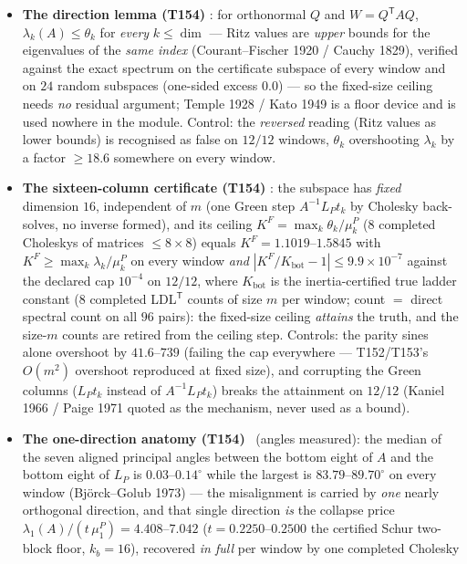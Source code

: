 \documentclass[11pt,a4paper]{article}
\begin{document}
\begin{itemize}[leftmargin=1.5em]
\item \textbf{The direction lemma (T154)} \mE: for orthonormal $Q$ and $W=Q^{\mathsf T}AQ$,
$\lambda_k(A)\le\theta_k$ for \emph{every} $k\le\dim$ --- Ritz values are \emph{upper}
bounds for the eigenvalues of the \emph{same index} (Courant--Fischer 1920 / Cauchy 1829),
verified against the exact spectrum on the certificate subspace of every window and on
$24$ random subspaces (one-sided excess $0.0$) --- so the fixed-size ceiling needs
\emph{no} residual argument; Temple 1928 / Kato 1949 is a floor device and is used nowhere
in the module. Control: the \emph{reversed} reading (Ritz values as lower bounds) is
recognised as false on $12/12$ windows, $\theta_k$ overshooting $\lambda_k$ by a factor
$\ge18.6$ somewhere on every window.
\item \textbf{The sixteen-column certificate (T154)} \mE: the subspace has \emph{fixed}
dimension $16$, independent of $m$ (one Green step $A^{-1}L_Pt_k$ by Cholesky back-solves,
no inverse formed), and its ceiling $K^F=\max_k\theta_k/\mu^P_k$ ($8$ completed Choleskys
of matrices $\le8\times8$) equals $K^F=1.1019$--$1.5845$ with $K^F\ge\max_k
\lambda_k/\mu^P_k$ on every window \emph{and} $|K^F/K_{\mathrm{bot}}-1|\le9.9\times10^{-7}$
against the declared cap $10^{-4}$ on $12/12$, where $K_{\mathrm{bot}}$ is the
inertia-certified true ladder constant ($8$ completed LDL$^{\mathsf T}$ counts of size $m$
per window; count $=$ direct spectral count on all $96$ pairs): the fixed-size ceiling
\emph{attains} the truth, and the size-$m$ counts are retired from the ceiling step.
Controls: the parity sines alone overshoot by $41.6$--$739$ (failing the cap everywhere
--- T152/T153's $O(m^2)$ overshoot reproduced at fixed size), and corrupting the Green
columns ($L_Pt_k$ instead of $A^{-1}L_Pt_k$) breaks the attainment on $12/12$ (Kaniel 1966
/ Paige 1971 quoted as the mechanism, never used as a bound).
\item \textbf{The one-direction anatomy (T154)} \mE\ (angles measured): the median of the
seven aligned principal angles between the bottom eight of $A$ and the bottom eight of
$L_P$ is $0.03$--$0.14^\circ$ while the largest is $83.79$--$89.70^\circ$ on every window
(Bj\"orck--Golub 1973) --- the misalignment is carried by \emph{one} nearly orthogonal
direction, and that single direction \emph{is} the collapse price
$\lambda_1(A)/(t\,\mu^P_1)=4.408$--$7.042$ ($t=0.2250$--$0.2500$ the certified Schur
two-block floor, $k_b=16$), recovered \emph{in full} per window by one completed Cholesky

\end{itemize}
\end{document}
